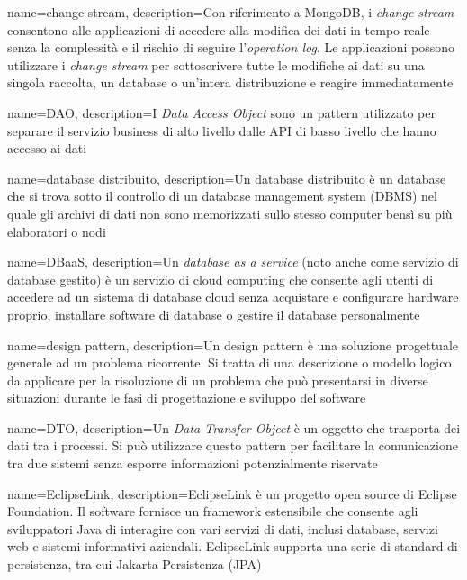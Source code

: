 

{
    name=change stream,
    description={Con riferimento a MongoDB, i \textit{change stream} consentono alle applicazioni di accedere alla modifica dei dati in tempo reale senza la complessità e il rischio di seguire l'\textit{operation log}. Le applicazioni possono utilizzare i \textit{change stream} per sottoscrivere tutte le modifiche ai dati su una singola raccolta, un database o un'intera distribuzione e reagire immediatamente \cite{site:mongochangestreams}}
}

{
    name=DAO,
    description={I \textit{Data Access Object} sono un pattern utilizzato per separare il servizio business di alto livello dalle API di basso livello che hanno accesso ai dati \cite{site:daodto}}
}

{
    name=database distribuito,
    description={Un database distribuito è un database che si trova sotto il controllo di un database management system (DBMS) nel quale gli archivi di dati non sono memorizzati sullo stesso computer bensì su più elaboratori o nodi \cite{site:wiki}}
}

{
    name=DBaaS,
    description={Un \textit{database as a service} (noto anche come servizio di database gestito) è un servizio di cloud computing che consente agli utenti di accedere ad un sistema di database cloud senza acquistare e configurare hardware proprio, installare software di database o gestire il database personalmente \cite{site:wiki}}
}

{
    name=design pattern,
    description={Un design pattern è una soluzione progettuale generale ad un problema ricorrente. Si tratta di una descrizione o modello logico da applicare per la risoluzione di un problema che può presentarsi in diverse situazioni durante le fasi di progettazione e sviluppo del software \cite{site:wiki}}
}

{
    name=DTO,
    description={Un \textit{Data Transfer Object} è un oggetto che trasporta dei dati tra i processi. Si può utilizzare questo pattern per facilitare la comunicazione tra due sistemi senza esporre informazioni potenzialmente riservate \cite{site:daodto}}
}

{
    name=EclipseLink,
    description={EclipseLink è un progetto open source di Eclipse Foundation. Il software fornisce un framework estensibile che consente agli sviluppatori Java di interagire con vari servizi di dati, inclusi database, servizi web e sistemi informativi aziendali. EclipseLink supporta una serie di standard di persistenza, tra cui Jakarta Persistenza (JPA) \cite{site:wiki}}
}


